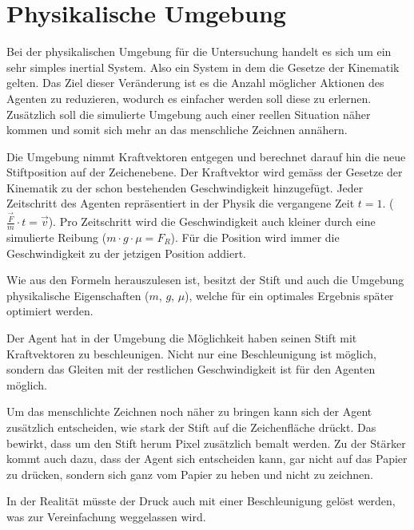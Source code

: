 \section{Physikalische Umgebung}
Bei der physikalischen Umgebung für die Untersuchung handelt es sich um ein sehr
simples inertial System. Also ein System in dem die Gesetze der Kinematik
gelten. Das Ziel dieser Veränderung ist es die Anzahl möglicher Aktionen des
Agenten zu reduzieren, wodurch es einfacher werden soll diese zu erlernen.
Zusätzlich soll die simulierte Umgebung auch einer reellen Situation näher
kommen und somit sich mehr an das menschliche Zeichnen annähern.

Die Umgebung nimmt Kraftvektoren entgegen und berechnet darauf hin die neue
Stiftposition auf der Zeichenebene. Der Kraftvektor wird gemäss der Gesetze der
Kinematik zu der schon bestehenden Geschwindigkeit hinzugefügt. Jeder
Zeitschritt des Agenten repräsentiert in der Physik die vergangene Zeit $t=1$.
($\frac{\vec{F}}{m}\cdot t=\vec{v}$). Pro Zeitschritt wird die Geschwindigkeit
auch kleiner durch eine simulierte Reibung ($m\cdot g \cdot \mu = F_R$). Für die
Position wird immer die Geschwindigkeit zu der jetzigen Position addiert.

Wie aus den Formeln herauszulesen ist, besitzt der Stift und auch die Umgebung
physikalische Eigenschaften ($m$, $g$, $\mu$), welche für ein optimales Ergebnis
später optimiert werden.

Der Agent hat in der Umgebung die Möglichkeit haben seinen Stift mit
Kraftvektoren zu beschleunigen. Nicht nur eine Beschleunigung ist möglich,
sondern das Gleiten mit der restlichen Geschwindigkeit ist für den Agenten
möglich.

Um das menschlichte Zeichnen noch näher zu bringen kann sich der Agent
zusätzlich entscheiden, wie stark der Stift auf die Zeichenfläche drückt. Das
bewirkt, dass um den Stift herum Pixel zusätzlich bemalt werden. Zu der Stärker
kommt auch dazu, dass der Agent sich entscheiden kann, gar nicht auf das Papier
zu drücken, sondern sich ganz vom Papier zu heben und nicht zu zeichnen.

In der Realität müsste der Druck auch mit einer Beschleunigung gelöst werden,
was zur Vereinfachung weggelassen wird.

